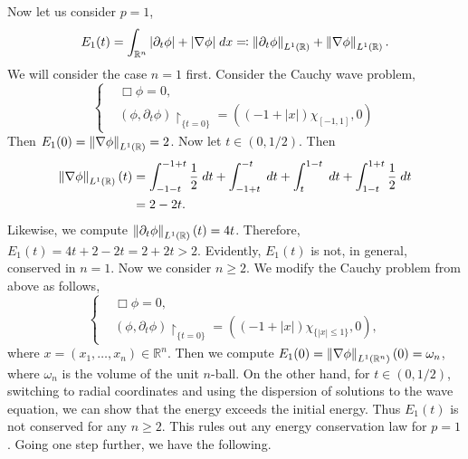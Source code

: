 \documentclass{article}
\begin{document}
Now let us consider $p = 1$, 
\begin{equation*}
	E_{1}(t) = \int_{\mathbb{R}^{n}}|\partial_{t}\phi| + |\nabla \phi|\;dx \eqqcolon \left\Vert \partial_{t}\phi \right\Vert_{L^{1}(\mathbb{R})} + \left\Vert \nabla \phi \right\Vert_{L^{1}(\mathbb{R})}. 
\end{equation*}
We will consider the case $n = 1$ first. Consider the Cauchy wave problem, 
\begin{equation*}
	\left\{
	\begin{alignedat}{1}
		&\Box\phi = 0,\\
		&(\phi, \partial_{t}\phi)\upharpoonright_{\{t = 0\}} = ((-1 + |x|)\chi_{[-1,1]}, 0)
	\end{alignedat}
	\right.
\end{equation*}
Then $E_{1}(0) = \left\Vert \nabla \phi \right\Vert_{L^{1}(\mathbb{R})} = 2$. Now let $t \in (0,1/2)$. Then 
\begin{align*}
	\begin{split}
		\left\Vert \nabla \phi \right\Vert_{L^{1}(\mathbb{R})}(t) &= \int_{-1-t}^{-1 + t}\frac{1}{2}\;dt + \int_{-1 + t}^{-t}\;dt + \int_{t}^{1 - t}\;dt + \int_{1 - t}^{1 + t}\frac{1}{2}\;dt \\
		&= 2 - 2t. 
	\end{split}
\end{align*}
Likewise, we compute $\left\Vert \partial_{t}\phi \right\Vert_{L^{1}(\mathbb{R})}(t) = 4t$. Therefore, $E_{1}(t) = 4t + 2 - 2t = 2 + 2t > 2$. Evidently, $E_{1}(t)$ is not, in general, conserved in $n = 1$. Now we consider $n \geq 2$. We modify the Cauchy problem from above as follows, 
\begin{equation*}
	\left\{
	\begin{alignedat}{1}
		&\Box\phi = 0,\\
		&(\phi, \partial_{t}\phi)\upharpoonright_{\{t = 0\}} = ((-1 + |x|)\chi_{\{|x| \leq 1\}}, 0), 
	\end{alignedat}
	\right.
\end{equation*}
where $x = (x_{1}, \ldots, x_{n}) \in\mathbb{R}^{n}$. Then we compute $E_{1}(0) = \left\Vert \nabla \phi \right\Vert_{L^{1}(\mathbb{R}^{n})}(0) = \omega_{n}$, where $\omega_{n}$ is the volume of the unit $n$-ball. On the other hand, for $t \in (0,1/2)$, switching to radial coordinates and using the dispersion of solutions to the wave equation, we can show that the energy exceeds the initial energy. Thus $E_{1}(t)$ is not conserved for any $n \geq 2$. This rules out any energy conservation law for $p = 1$. Going one step further, we have the following. 
\end{document}
